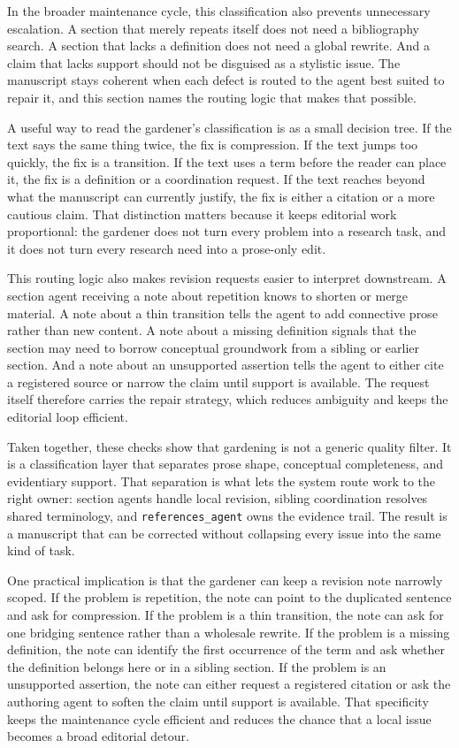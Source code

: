 \documentclass[11pt]{article}
\begin{document}
In the broader maintenance cycle, this classification also prevents unnecessary escalation. A section that merely repeats itself does not need a bibliography search. A section that lacks a definition does not need a global rewrite. And a claim that lacks support should not be disguised as a stylistic issue. The manuscript stays coherent when each defect is routed to the agent best suited to repair it, and this section names the routing logic that makes that possible.

A useful way to read the gardener's classification is as a small decision tree. If the text says the same thing twice, the fix is compression. If the text jumps too quickly, the fix is a transition. If the text uses a term before the reader can place it, the fix is a definition or a coordination request. If the text reaches beyond what the manuscript can currently justify, the fix is either a citation or a more cautious claim. That distinction matters because it keeps editorial work proportional: the gardener does not turn every problem into a research task, and it does not turn every research need into a prose-only edit.

This routing logic also makes revision requests easier to interpret downstream. A section agent receiving a note about repetition knows to shorten or merge material. A note about a thin transition tells the agent to add connective prose rather than new content. A note about a missing definition signals that the section may need to borrow conceptual groundwork from a sibling or earlier section. And a note about an unsupported assertion tells the agent to either cite a registered source or narrow the claim until support is available. The request itself therefore carries the repair strategy, which reduces ambiguity and keeps the editorial loop efficient.

Taken together, these checks show that gardening is not a generic quality filter. It is a classification layer that separates prose shape, conceptual completeness, and evidentiary support. That separation is what lets the system route work to the right owner: section agents handle local revision, sibling coordination resolves shared terminology, and \texttt{references\_agent} owns the evidence trail. The result is a manuscript that can be corrected without collapsing every issue into the same kind of task.

One practical implication is that the gardener can keep a revision note narrowly scoped. If the problem is repetition, the note can point to the duplicated sentence and ask for compression. If the problem is a thin transition, the note can ask for one bridging sentence rather than a wholesale rewrite. If the problem is a missing definition, the note can identify the first occurrence of the term and ask whether the definition belongs here or in a sibling section. If the problem is an unsupported assertion, the note can either request a registered citation or ask the authoring agent to soften the claim until support is available. That specificity keeps the maintenance cycle efficient and reduces the chance that a local issue becomes a broad editorial detour.
\end{document}
